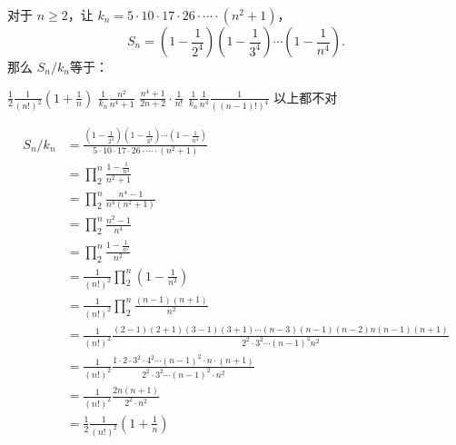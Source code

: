 \documentclass[answers]{exam}
\begin{document}
\begin{questions}
	\question 对于 \( n \ge 2 \)，让 \( k_n = 5 \cdot 10 \cdot 17 \cdot 26 \cdot\cdots\cdot (n^2 + 1) \)，
	\begin{equation*}
		S_n = (1-\frac{1}{2^4})(1-\frac{1}{3^4})\cdots(1-\frac{1}{n^4}).
	\end{equation*}
	那么 \( S_n / k_n \)等于：

	\begin{oneparchoices}
		\CorrectChoice \(\displaystyle \frac{1}{2}\frac{1}{(n!)^2}(1+\frac{1}{n}) \)
		\choice \(\displaystyle \frac{1}{k_n}\frac{n^2}{n^4 + 1} \)
		\choice \(\displaystyle \frac{n^4 + 1}{2n+2}\cdot \frac{1}{n!} \)
		\choice \(\displaystyle \frac{1}{k_n}\frac{1}{n^4}\frac{1}{((n-1)!)^4} \)
		\choice 以上都不对
	\end{oneparchoices}

	\begin{solution}
		\begin{align*}
			S_n / k_n & = \frac{(1-\frac{1}{2^4})(1-\frac{1}{3^4})\cdots(1-\frac{1}{n^4})}{5 \cdot 10 \cdot 17 \cdot 26
			\cdot\cdots\cdot (n^2 + 1)}                                                                                 \\
			          & = \prod_2^n\frac{1 - \frac{1}{n^4}}{n^2 + 1}                                                    \\
			          & = \prod_2^n\frac{n^4 - 1}{n^4(n^2+1)}                                                           \\
			          & = \prod_2^n\frac{n^2 - 1}{n^4}                                                                  \\
			          & = \prod_2^n\frac{1 - \frac{1}{n^2}}{n^2}                                                        \\
			          & = \frac{1}{(n!)^2} \prod_2^n(1-\frac{1}{n^2})                                                   \\
			          & = \frac{1}{(n!)^2} \prod_2^n\frac{(n-1)(n+1)}{n^2}                                              \\
			          & = \frac{1}{(n!)^2} \frac{(2-1)(2+1)(3-1)(3+1)\cdots
			(n-3)(n-1)(n-2)n(n-1)(n+1)}{2^2\cdot3^2\cdots (n-1)^2n^2}                                                   \\
			          & = \frac{1}{(n!)^2} \frac{1\cdot2\cdot 3^2 \cdot 4^2 \cdots (n-1)^2 \cdot n \cdot
			(n+1)}{2^2\cdot3^2\cdots (n-1)^2\cdot n^2}                                                                  \\
			          & = \frac{1}{(n!)^2} \frac{2n(n+1)}{2^2\cdot n^2}                                                 \\
			          & = \frac12\frac1{(n!)^2}(1+\frac1n)
		\end{align*}
	\end{solution}


\end{questions}
\end{document}
